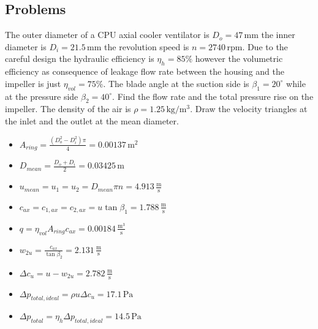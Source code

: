 \subsection{Problems}
\begin{tcolorbox}

The outer diameter of a CPU axial cooler ventilator is $D_o=47\,\mathrm{mm}$ the inner diameter is $D_i=21.5\,\mathrm{mm}$ the revolution speed is $n=2740\,\mathrm{rpm}$. Due to the careful design the hydraulic efficiency is $\eta_h=85\%$ however the volumetric efficiency as consequence of leakage flow rate between the housing and the impeller is just $\eta_{vol}=75\%$. The blade angle at the suction side is $\beta_1=20^\circ$ while at the pressure side $\beta_2=40^\circ$. Find the flow rate and the total pressure rise on the impeller. The density of the air is $\rho=1.25\,\mathrm{kg/m^3}$. Draw the velocity triangles at the inlet and the outlet at the mean diameter.
%
\begin{itemize}
\item $A_{ring}=\frac{\left(D_o^2-D_i^2\right)\pi}{4}=0.00137\,\mathrm{m^2}$
\item $D_{mean}=\frac{D_o+D_i}{2}=0.03425\,\mathrm{m}$
\item $u_{mean}=u_1=u_2=D_{mean}\pi n=4.913\,\mathrm{\frac{m}{s}}$
\item $c_{ax}=c_{1,ax}=c_{2,ax}=u \tan\beta_1=1.788\,\mathrm{\frac{m}{s}}$
\item $q=\eta_{vol}A_{ring}c_{ax}=0.00184\,\mathrm{\frac{m^3}{s}}$
\item $w_{2u}=\frac{c_{ax}}{\tan\beta_2}=2.131\,\mathrm{\frac{m}{s}}$
\item $\Delta c_u=u-w_{2u}=2.782\,\mathrm{\frac{m}{s}}$
\item $\Delta p_{total,ideal}=\rho u\Delta c_u=17.1\,\mathrm{Pa}$
\item $\Delta p_{total}=\eta_h \Delta p_{total,ideal}=14.5\,\mathrm{Pa}$
\end{itemize}
\end{tcolorbox}
	

